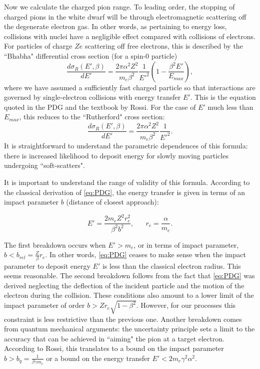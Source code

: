 \documentclass[11 pt, preprint,preprintnumbers,amsmath,amssymb, prd]{revtex4}
\def\r{\right)}
\def\l{\left(}
\begin{document}
Now we calculate the charged pion range. To leading order, the stopping of charged pions in the white dwarf will be through electromagnetic scattering off the degenerate electron gas. In other words, as pertaining to energy loss, collisions with nuclei have a negligible effect compared with collisions of electrons. For particles of charge $Ze$ scattering off free electrons, this is described by the ``Bhabha" differential cross section (for a spin-0 particle)
\begin{equation}
\label{eq:PDG}
\frac{d \sigma_R (E', \beta)}{dE'}= \frac{2 \pi  \alpha^2 Z^2}{m_e \beta^2} \frac{1}{E'^2} \l1- \frac{\beta^2 E'}{E_{max}}\r,
\end{equation}
where we have assumed a sufficiently fast charged particle so that interactions are governed by single-electron collisions with energy transfer $E'$. This is the equation quoted in the PDG and the textbook by Rossi. For the case of $E'$ much less than $E_{max}$, this reduces to the ``Rutherford" cross section:
\begin{equation}
\label{eq:PDG}
\frac{d \sigma_R (E', \beta)}{dE'}= \frac{2 \pi  \alpha^2 Z^2}{m_e \beta^2}  \frac{1}{E'^2}. 
\end{equation}
It is straightforward to understand the parametric dependences of this formula: there is increased likelihood to deposit energy for slowly moving particles undergoing ``soft-scatters".  

It is important to understand the range of validity of this formula. According to the classical derivation of \ref{eq:PDG}, the energy transfer is given in terms of an impact parameter $b$ (distance of closest approach):

\begin{equation}
E' = \frac{2 m_e Z^2 r_e^2}{\beta^2 b^2}, \hspace{20pt} r_e = \frac{\alpha}{m_e}. 
\end{equation}

The first breakdown occurs when $E' > m_e$, or in terms of impact parameter, $b< b_{rel} = \frac{Z}{\beta} r_e$. In other words, \ref{eq:PDG} ceases to make sense when the impact parameter to deposit energy $E'$ is less than the classical electron radius. This seems reasonable. The second breakdown follows from the fact that \ref{eq:PDG} was derived neglecting the deflection of the incident particle and the motion of the electron during the collision. These conditions also amount to a lower limit of the impact parameter of order $b > Z r_e \sqrt{1-\beta^2}$. However, for our processes this constraint is less restrictive than the previous one. Another breakdown comes from quantum mechanical arguments: the uncertainty principle sets a limit to the accuracy that can be achieved in ``aiming" the pion at a target electron. According to Rossi, this translates to a bound on the impact parameter $b > b_q = \frac{1}{\beta \gamma m_e}$ or a bound on the energy transfer $E' < 2 m_e \gamma^2 \alpha^2$. 
\end{document}
